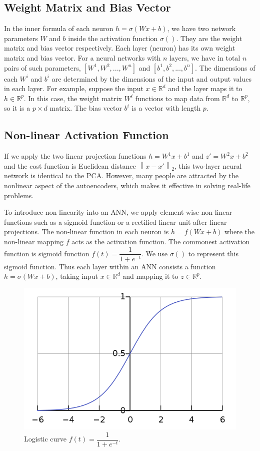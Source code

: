 \documentclass[12pt]{report} %
\newcommand{\norm}[1]{\left\lVert #1 \right\rVert}
\begin{document}
\subsection{Weight Matrix and Bias Vector}
In the inner formula of each neuron $h=\sigma(Wx+b)$, we have two network parameters $W$ and $b$ inside the activation function $\sigma()$. They are the weight matrix and bias vector respectively. Each layer (neuron) has its own weight matrix and bias vector. For a neural networks with $n$ layers, we have in total $n$ pairs of such parameters, $[W^1, W^2,...,W^n]$ and $[b^1,b^2,...,b^n]$. The dimensions of each $W^i$ and $b^i$ are determined by the dimensions of the input and output values in each layer. For example, suppose the input \(x\in \mathbb{R}^{d}\) and the layer maps it to \(h\in \mathbb{R}^{p}\). In this case, the weight matrix $W^i$ functions to map data from $\mathbb{R}^{d}$ to $\mathbb{R}^{p}$, so it is a $p \times d$ matrix. The bias vector $b^i$ is a vector with length $p$.

\subsection{Non-linear Activation Function}
If we apply the two linear projection functions $h=W^1x+b^1$ and $z'=W^2x+b^2$ and the cost function is Euclidean distance $\norm{x-x'}_2$, this two-layer neural network is identical to the PCA. However, many people are attracted by the nonlinear aspect of the autoencoders, which makes it effective in solving real-life problems.

To introduce non-linearity into an ANN, we apply element-wise non-linear functions such as a sigmoid function or a rectified linear unit after linear projections. The non-linear function in each neuron is $h= f(Wx + b)$ where the non-linear mapping $f$ acts as the activation function. The commonest activation function is sigmoid function $f(t)=\dfrac{1}{1+e^{-t}}$. We use $\sigma()$ to represent this sigmoid function. Thus each layer within an ANN consists a function \(h=\sigma(Wx+b)\), taking input \(x\in \mathbb{R}^{d}\) and mapping it to \(z\in \mathbb{R}^{p}\).
\begin{figure}[H]
	\centering
	\includegraphics[scale=0.4]{pictures/sigmoid.png}
	\caption{Logistic curve $f(t)=\dfrac{1}{1+e^{-t}}$\cite{SIGPIC}.}
	\label{fig:2}
\end{figure}
\end{document}

